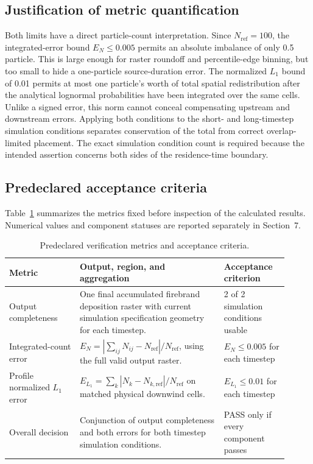 \subsection{Justification of metric quantification}

Both limits have a direct particle-count interpretation.  Since
\(N_{\mathrm{ref}}=100\), the integrated-error bound \(E_N\le0.005\) permits an
absolute imbalance of only 0.5 particle.  This is large enough for raster
roundoff and percentile-edge binning, but too small to hide a one-particle
source-duration error.  The normalized \(L_1\) bound of 0.01 permits at most
one particle's worth of total spatial redistribution after the analytical
lognormal probabilities have been integrated over the same cells.  Unlike a
signed error, this norm cannot conceal compensating upstream and downstream
errors.  Applying both conditions to the short- and long-timestep simulation conditions
separates conservation of the total from correct overlap-limited placement.
The exact simulation condition count is required because the intended assertion concerns
both sides of the residence-time boundary.

\subsection{Predeclared acceptance criteria}

Table~\ref{tab:acceptance-contract} summarizes the metrics fixed before
inspection of the calculated results. Numerical values and component statuses
are reported separately in Section~7.

\begin{table}[H]
\centering
\footnotesize
\caption{Predeclared verification metrics and acceptance criteria.}
\label{tab:acceptance-contract}
\begin{tabular}{@{}p{0.23\linewidth}p{0.47\linewidth}p{0.21\linewidth}@{}}
\toprule
Metric & Output, region, and aggregation & Acceptance criterion\\
\midrule
Output completeness & One final accumulated firebrand deposition raster with current simulation specification geometry for each timestep. & 2 of 2 simulation conditions usable \\
Integrated-count error & \(E_N=|\sum_{ij}N_{ij}-N_{\mathrm{ref}}|/N_{\mathrm{ref}}\), using the full valid output raster. & \(E_N\le0.005\) for each timestep \\
Profile normalized \(L_1\) error & \(E_{L_1}=\sum_k|N_k-N_{k,\mathrm{ref}}|/N_{\mathrm{ref}}\) on matched physical downwind cells. & \(E_{L_1}\le0.01\) for each timestep \\
Overall decision & Conjunction of output completeness and both errors for both timestep simulation conditions. & PASS only if every component passes \\
\bottomrule
\end{tabular}
\end{table}

